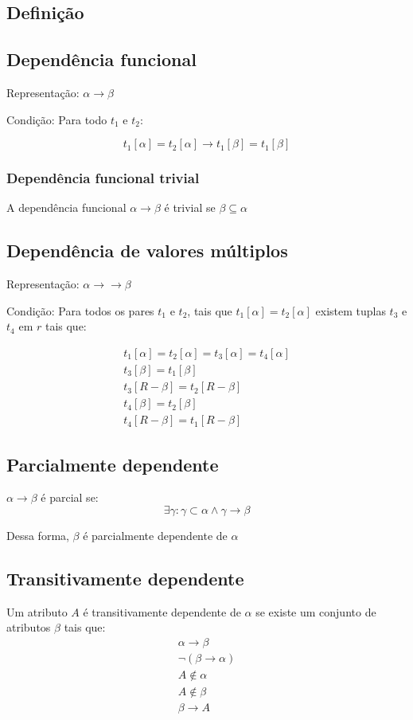 \begin{tcolorbox}[sharp corners, colback=white,boxrule=1mm]
	\section{Definição}
	\subsection{Dependência funcional}
	Representação: $\alpha \to \beta$
	
	Condição: Para todo $t_1$ e $t_2$:
	
	\[t_1[\alpha] = t_2[\alpha] \to t_1[\beta] = t_1[\beta]\]
	
	\subsubsection{Dependência funcional trivial}
	
	A dependência funcional $\alpha \to \beta$ é trivial se $\beta \subseteq \alpha$
	
	\subsection{Dependência de valores múltiplos}
	Representação: $\alpha \to\to \beta$
	
	Condição: Para todos os pares $t_1$ e $t_2$, tais que $t_1[\alpha] = t_2[\alpha]$ existem tuplas $t_3$ e $t_4$ em $r$ tais que:
	
	\begin{gather*}
		t_1[\alpha] = t_2[\alpha] = t_3[\alpha] = t_4[\alpha]\\
		t_3[\beta] = t_1[\beta]\\
		t_3[R - \beta] = t_2[R-\beta]\\
		t_4[\beta] = t_2[\beta]\\
		t_4[R - \beta] = t_1[R-\beta]
	\end{gather*}

	\subsection{Parcialmente dependente}
	$\alpha \to \beta$ é parcial se:
	\[\exists \gamma: \gamma \subset \alpha \wedge \gamma \to \beta\]
	
	Dessa forma, $\beta$ é parcialmente dependente de $\alpha$
	
	\subsection{Transitivamente dependente}
	Um atributo $A$ é transitivamente dependente de $\alpha$ se existe um conjunto de atributos $\beta$ tais que:
	\begin{gather*}
		\alpha \to \beta\\
		\neg(\beta \to \alpha)\\
		A \not\in \alpha\\
		A \not\in \beta\\
		\beta \to A
	\end{gather*}
\end{tcolorbox}


